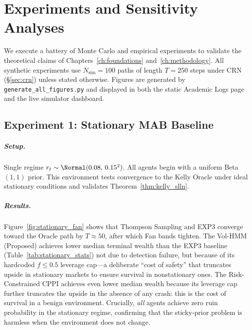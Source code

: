 \chapter{Experiments and Sensitivity Analyses}
\label{ch:experiments}

We execute a battery of Monte Carlo and empirical experiments to validate the
theoretical claims of Chapters~\ref{ch:foundations} and~\ref{ch:methodology}.
All synthetic experiments use $N_{\text{sim}}=100$ paths of length $T=250$
steps under CRN (\S\ref{sec:crn}) unless stated otherwise.  Figures are
generated by \texttt{generate\_all\_figures.py} and displayed in both the
static Academic Logs page and the live simulator dashboard.

\section{Experiment 1: Stationary MAB Baseline}
\label{sec:exp1}

\paragraph{Setup.}
Single regime $r_t\sim\Normal(0.08,\,0.15^2)$.  All agents begin with a
uniform Beta$(1,1)$ prior.  This environment tests convergence to the Kelly
Oracle under ideal stationary conditions and validates Theorem~\ref{thm:kelly_slln}.

\paragraph{Results.}
Figure~\ref{fig:stationary_fan} shows that Thompson Sampling and EXP3
converge toward the Oracle path by $T\approx 50$, after which Fan bands
tighten. The Vol-HMM (Proposed) achieves lower median terminal wealth than
the EXP3 baseline (Table~\ref{tab:stationary_stats}) not due to detection
failure, but because of its hardcoded $f \leq 0.5$ leverage cap---a deliberate
``cost of safety'' that truncates upside in stationary markets to ensure
survival in nonstationary ones.  The Risk-Constrained CPPI achieves even lower
median wealth because its leverage cap further truncates
the upside in the absence of any crash: this is the cost of survival
in a benign environment.
  Crucially, \emph{all} agents achieve zero ruin
probability in the stationary regime, confirming that the sticky-prior
problem is harmless when the environment does not change.

